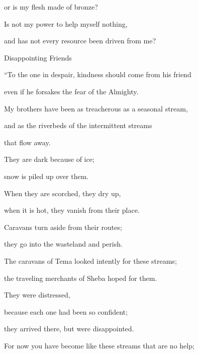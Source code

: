 {\par }{\Q or
is my flesh
made of bronze?
\par }{\Q {}Is not
my power to help
myself nothing,
\par }{\Q and has not every resource
been driven
from me?
\par }{\SH Disappointing Friends
\par }{\Q {}“To the one in despair,
kindness
should come from his friend
\par }{\Q even if he forsakes
the fear
of the Almighty.
\par }{\Q {}My brothers
have been as treacherous
as
a seasonal stream,
\par }{\Q and as the riverbeds
of the intermittent streams
\par }{\Q that flow away.
\par }{\Q {}They are dark
because of ice;
\par }{\Q snow
is piled up over them.
\par }{\Q {}When they are scorched,
they dry up,
\par }{\Q when it is hot,
they vanish
from their place.
\par }{\Q {}Caravans
turn aside from their routes;
\par }{\Q they go
into the wasteland
and perish.
\par }{\Q {}The caravans
of Tema
looked intently
for these streams;

\par }{\Q the traveling merchants of Sheba
hoped for them.
\par }{\Q {}They were distressed,
\par }{\Q because
each one had been so confident;
\par }{\Q they arrived
there, but were disappointed.
\par }{\Q {}For
now
you have become
like these streams that are no
help;

}
